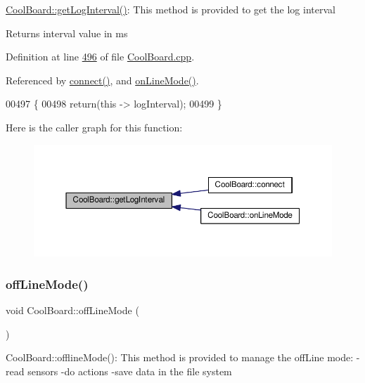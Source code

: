 \hyperlink{class_cool_board_aaa24480b273fc095a1356a589c333781}{Cool\+Board\+::get\+Log\+Interval()}\+: This method is provided to get the log interval

\begin{DoxyReturn}{Returns}
interval value in ms 
\end{DoxyReturn}


Definition at line \hyperlink{_cool_board_8cpp_source_l00496}{496} of file \hyperlink{_cool_board_8cpp_source}{Cool\+Board.\+cpp}.



Referenced by \hyperlink{_cool_board_8cpp_source_l00071}{connect()}, and \hyperlink{_cool_board_8cpp_source_l00097}{on\+Line\+Mode()}.


\begin{DoxyCode}
00497 \{
00498     \textcolor{keywordflow}{return}(\textcolor{keyword}{this} -> logInterval);
00499 \}
\end{DoxyCode}
Here is the caller graph for this function\+:
\nopagebreak
\begin{figure}[H]
\begin{center}
\leavevmode
\includegraphics[width=350pt]{class_cool_board_aaa24480b273fc095a1356a589c333781_icgraph}
\end{center}
\end{figure}
\mbox{\label{class_cool_board_ae6b5e1274d760462290192acea4adca8}} 
\subsubsection{\texorpdfstring{off\+Line\+Mode()}{offLineMode()}}
{\footnotesize\ttfamily void Cool\+Board\+::off\+Line\+Mode (\begin{DoxyParamCaption}{ }\end{DoxyParamCaption})}

Cool\+Board\+::offline\+Mode()\+: This method is provided to manage the off\+Line mode\+: -\/read sensors -\/do actions -\/save data in the file system 

